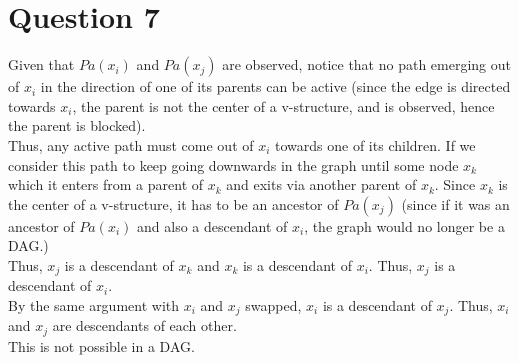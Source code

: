 \section{Question 7}
Given that $Pa(x_i)$ and $Pa(x_j)$ are observed, notice that no path emerging out of $x_i$ in the direction of one of its parents can be active (since the edge is directed towards $x_i$, the parent is not the center of a v-structure, and is observed, hence the parent is blocked).\\
Thus, any active path must come out of $x_i$ towards one of its children. If we consider this path to keep going downwards in the graph until some node $x_k$ which it enters from a parent of $x_k$ and exits via another parent of $x_k$. Since $x_k$ is the center of a v-structure, it has to be an ancestor of $Pa(x_j)$ (since if it was an ancestor of $Pa(x_i)$ and also a descendant of $x_i$, the graph would no longer be a DAG.)\\
Thus, $x_j$ is a descendant of $x_k$ and $x_k$ is a descendant of $x_i$. Thus, $x_j$ is a descendant of $x_i$.\\
By the same argument with $x_i$ and $x_j$ swapped, $x_i$ is a descendant of $x_j$. Thus, $x_i$ and $x_j$ are descendants of each other.\\
This is not possible in a DAG. 